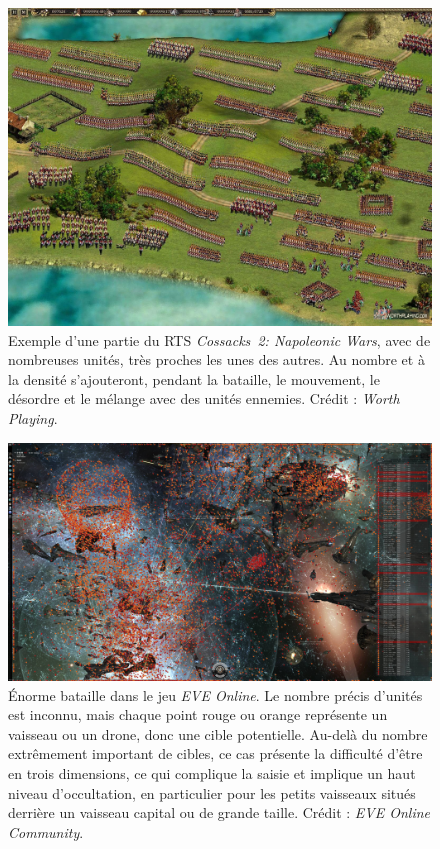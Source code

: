 	
	\begin{figure}[ht]
		\centering
		\includegraphics[width=\textwidth]{figures/ch1/cossacks2}
		\caption{Exemple d'une partie du RTS \emph{Cossacks~2: Napoleonic Wars}, avec de nombreuses unités, très proches les unes des autres. Au nombre et à la densité s'ajouteront, pendant la bataille, le mouvement, le désordre et le mélange avec des unités ennemies. Crédit : \emph{Worth Playing}.}
		\label{fig:cossacks2}
	\end{figure}
	
	\begin{figure}[ht]
		\centering
		\includegraphics[width=\textwidth]{figures/ch1/eveonline}
		\caption{Énorme bataille dans le jeu \emph{EVE Online}. Le nombre précis d'unités est inconnu, mais chaque point rouge ou orange représente un vaisseau ou un drone, donc une cible potentielle. Au-delà du nombre extrêmement important de cibles, ce cas présente la difficulté d'être en trois dimensions, ce qui complique la saisie et implique un haut niveau d'occultation, en particulier pour les petits vaisseaux situés derrière un vaisseau capital ou de grande taille. Crédit : \emph{EVE Online Community}.}
		\label{fig:eveonline}
	\end{figure}
	

